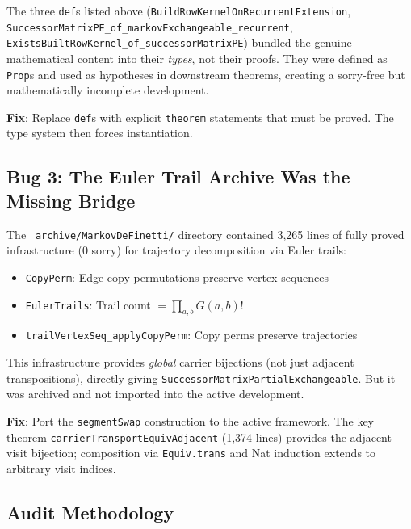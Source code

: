 \documentclass[11pt,a4paper]{article}
\theoremstyle{definition}
\begin{document}
The three \texttt{def}s listed above (\texttt{BuildRowKernelOnRecurrentExtension},
\texttt{SuccessorMatrixPE\_of\_markovExchangeable\_recurrent},
\texttt{ExistsBuiltRowKernel\_of\_successorMatrixPE}) bundled the genuine
mathematical content into their \emph{types}, not their proofs.
They were defined as \texttt{Prop}s and used as hypotheses in downstream
theorems, creating a sorry-free but mathematically incomplete development.

\textbf{Fix}: Replace \texttt{def}s with explicit \texttt{theorem} statements
that must be proved. The type system then forces instantiation.

\subsection{Bug 3: The Euler Trail Archive Was the Missing Bridge}

The \texttt{\_archive/MarkovDeFinetti/} directory contained 3,265 lines
of fully proved infrastructure (0 sorry) for trajectory decomposition
via Euler trails:

\begin{itemize}
\item \texttt{CopyPerm}: Edge-copy permutations preserve vertex sequences
\item \texttt{EulerTrails}: Trail count $= \prod_{a,b} G(a,b)!$
\item \texttt{trailVertexSeq\_applyCopyPerm}: Copy perms preserve trajectories
\end{itemize}

This infrastructure provides \emph{global} carrier bijections (not just
adjacent transpositions), directly giving \texttt{SuccessorMatrixPartialExchangeable}.
But it was archived and not imported into the active development.

\textbf{Fix}: Port the \texttt{segmentSwap} construction to the active
framework. The key theorem \texttt{carrierTransportEquivAdjacent} (1,374 lines)
provides the adjacent-visit bijection; composition via \texttt{Equiv.trans}
and Nat induction extends to arbitrary visit indices.

\subsection{Audit Methodology}
\end{document}
